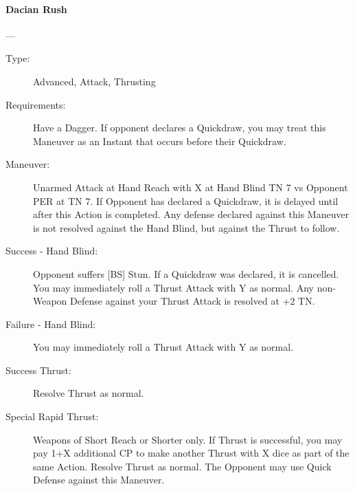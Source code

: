 \documentclass[oneside,11pt,english]{book}
\begin{document}
\paragraph{\large\label{man:Dacian Rush}Dacian Rush}---\quad{\large[2+X+Y]}
\vspace{-10pt}\begin{description}
\item [Type:] Advanced, Attack, Thrusting 
\item [Requirements:] Have a Dagger. If opponent declares a Quickdraw, you may
  treat this Maneuver as an Instant that occurs before their Quickdraw. 
\item [Maneuver:] Unarmed Attack at Hand Reach with X at Hand Blind TN 7 vs
  Opponent PER at TN 7. If Opponent has declared a Quickdraw, it is delayed
  until after this Action is completed. Any defense declared against this
  Maneuver is not resolved against the Hand Blind, but against the Thrust to
  follow.
\item [Success - Hand Blind:] Opponent suffers [BS] Stun. If a Quickdraw was
declared, it is cancelled. You may immediately roll a Thrust Attack with Y as
  normal. Any non-Weapon Defense against your Thrust Attack is resolved at +2
  TN. 
\item [Failure - Hand Blind:] You may immediately roll a Thrust Attack with Y as
  normal.  
\item [Success Thrust:] Resolve Thrust as normal. 
\item [Special Rapid Thrust:] Weapons of Short Reach or Shorter only. If Thrust
  is successful, you may pay 1+X additional CP to make another Thrust with X
  dice as part of the same Action. Resolve Thrust as normal. The Opponent may
  use Quick Defense against this Maneuver.  
\end{description}
\end{document}
